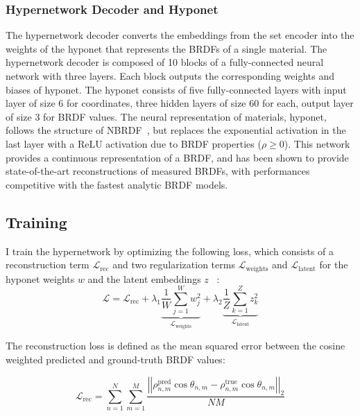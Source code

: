 \subsubsection{Hypernetwork Decoder and Hyponet} %
The hypernetwork decoder converts the embeddings from the set encoder into the weights of the hyponet that represents the BRDFs of a single material. The hypernetwork decoder is composed of 10 blocks of a fully-connected neural network with three layers. Each block outputs the corresponding weights and biases of hyponet. The hyponet consists of five fully-connected layers with input layer of size 6 for coordinates, three hidden layers of size 60 for each, output layer of size 3 for BRDF values. The neural representation of materials, hyponet, follows the structure of NBRDF~\cite{sztrajman2021neural}, but replaces the exponential activation in the last layer with a ReLU activation due to BRDF properties ($\rho \ge 0$). This network provides a continuous representation of a BRDF, and has been shown to provide state-of-the-art reconstructions of measured BRDFs, with performances competitive with the fastest analytic BRDF models.


\subsection{Training}
\label{sec:traindet}


I train the hypernetwork by optimizing the following loss, which consists of a reconstruction term $\mathcal{L}_\text{rec}$ and two regularization terms $\mathcal{L}_\text{weights}$ and $\mathcal{L}_\text{latent}$ for the hyponet weights $w$ and the latent embeddings $z$ ~\cite{ha2017hypernetworks}:
\begin{equation}
    \mathcal{L} = \mathcal{L}_\text{rec} +
              \lambda_1 \underbrace{\frac{1}{W} \sum_{j=1}^W w^2_j}_{\mathcal{L}_\text{weights}} +
              \lambda_2 \underbrace{\frac{1}{Z} \sum_{k=1}^Z z^2_k}_{\mathcal{L}_\text{latent}}
    \label{eq:loss}
\end{equation}

The reconstruction loss is defined as the mean squared error between the cosine weighted predicted and ground-truth BRDF values:

\begin{equation}
    \mathcal{L}_{\text{rec}} = \sum_{n=1}^{N}\sum_{m=1}^{M}\frac{\left|\left|\rho^{\text{pred}}_{n, m} \cos{\theta_{n, m}} - \rho^{\text{true}}_{n, m} \cos{\theta_{n, m}}\right|\right|_{2}}{NM}
    \label{eq:Lrec}
\end{equation}

